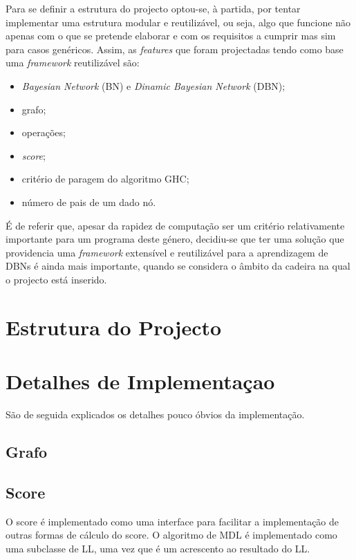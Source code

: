 \documentclass[10pt]{article}
\numberwithin{equation}{section}
\begin{document}
Para se definir a estrutura do projecto optou-se, à partida, por tentar implementar uma estrutura modular e reutilizável, ou seja, algo que funcione não apenas com o que se pretende elaborar e com os requisitos a cumprir mas sim para casos genéricos. Assim, as \textit{features} que foram projectadas tendo como base uma \textit{framework} reutilizável são:

\begin{itemize}
	\item \textit{Bayesian Network} (BN) e \textit{Dinamic Bayesian Network} (DBN);
	\vspace{-2.5mm}
	\item grafo;
	\vspace{-2.5mm}
	\item operações; 
	\vspace{-2.5mm}
	\item \textit{score};
	\vspace{-2.5mm}
	\item critério de paragem do algoritmo GHC;
	\vspace{-2.5mm}
	\item número de pais de um dado nó.
\end{itemize}

É de referir que, apesar da rapidez de computação ser um critério relativamente importante para um programa deste género, decidiu-se que ter uma solução que providencia uma \textit{framework} extensível e reutilizável para a aprendizagem de DBNs é ainda mais importante, quando se considera o âmbito da cadeira na qual o projecto está inserido.

\section{Estrutura do Projecto}


\section{Detalhes de Implementaçao}
São de seguida explicados os detalhes pouco óbvios da implementação.

\subsection{Grafo}


\subsection{Score}
O score é implementado como uma interface para facilitar a implementação de outras formas de cálculo do score. O algoritmo de MDL é implementado como uma subclasse de LL, uma vez que é um acrescento ao resultado do LL.
\end{document}
